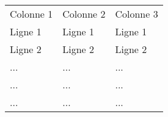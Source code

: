 \begin{tabular}{|L{5.1cm}C{5.1cm}R{5cm}|}  %
	\hline
	Colonne 1 & Colonne 2 	 & Colonne 3 \\
	Ligne 1   & Ligne 1   	 & Ligne 1 	 \\
	Ligne 2   & Ligne 2 	 & Ligne 2 	 \\
	...	      & ... 		 & ... 		 \\
	...		  & ... 		 & ... 		 \\
	...		  & ... 		 & ... 		 \\
	\hline
\end{tabular}